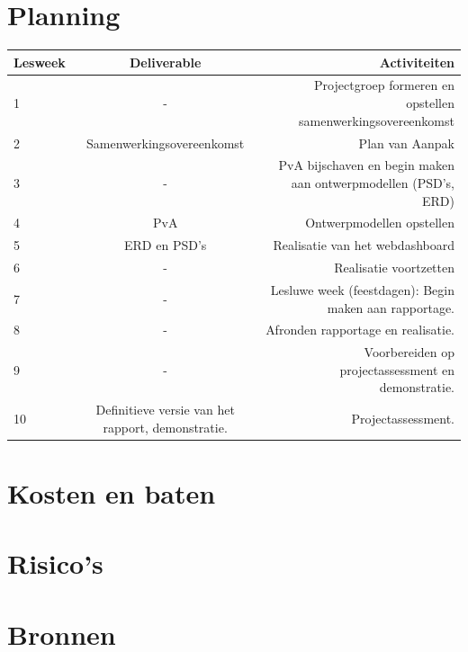 \documentclass[11pt]{article}
\begin{document}
\section{Planning}

\begin{adjustbox}{width=\textwidth}
\begin{tabular}{|l | c | r |}
	\hline
	Lesweek & Deliverable & Activiteiten \\ \hline
	1 & -	& Projectgroep formeren en opstellen samenwerkingsovereenkomst \\ \hline
	2 & Samenwerkingsovereenkomst & Plan van Aanpak\\ \hline
	3 & - & PvA bijschaven en begin maken aan ontwerpmodellen
	(PSD’s, ERD)\\ \hline
	4 & PvA & Ontwerpmodellen opstellen\\ \hline
	5 & ERD en PSD's & Realisatie van het webdashboard\\ \hline
	6 & - & Realisatie voortzetten\\ \hline
	7 & - & Lesluwe week (feestdagen): Begin maken aan rapportage.\\ \hline
	8 & - & Afronden rapportage en realisatie.\\ \hline
	9 & - & Voorbereiden op projectassessment en demonstratie.\\ \hline
	10 & Definitieve versie van	het rapport, demonstratie.&
Projectassessment.\\ \hline
	
\end{tabular}
\end{adjustbox}
\newpage
\section{Kosten en baten}
\newpage
\section{Risico's}
\newpage
\section{Bronnen}
\newpage
\end{document}
